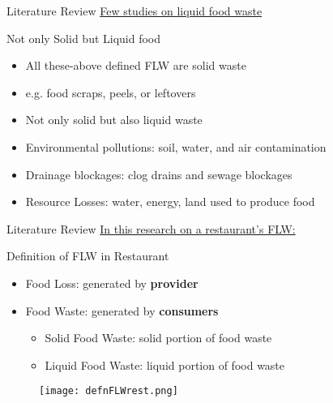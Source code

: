 \documentclass{beamer}\usepackage[]{graphicx}\usepackage[]{xcolor}
\begin{document}
\begin{frame}{Literature Review}
    \underline{Few studies on liquid food waste}
    
    \begin{block}{Not only Solid but Liquid food}       
        \begin{itemize}
            \item All these-above defined FLW are solid waste
            \item e.g. food scraps, peels, or leftovers
            \item Not only solid but also liquid waste
            \item Environmental pollutions: soil, water, and air contamination
            \item Drainage blockages: clog drains and sewage blockages
            \item Resource Losses: water, energy, land used to produce food
        \end{itemize}
    \end{block}
\end{frame}

\begin{frame}{Literature Review}
    \underline{In this research on a restaurant's FLW:}
    \begin{block}{Definition of FLW in Restaurant}
        \begin{itemize}
            \item Food Loss: generated by \textbf{provider}
            \item Food Waste: generated by \textbf{consumers}
            \begin{itemize}
                \item Solid Food Waste: solid portion of food waste
                \item Liquid Food Waste: liquid portion of food waste
            \end{itemize}
        \end{itemize}
    \end{block}
        \begin{figure}
            \centering
            \texttt{[image: defnFLWrest.png]}
        \end{figure}
\end{frame}

\end{document}
